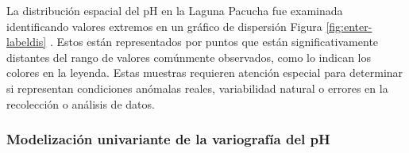  La distribución espacial del pH en la Laguna Pacucha fue examinada identificando valores extremos en un gráfico de dispersión Figura \ref{fig:enter-labeldis} . Estos están representados por puntos que están significativamente distantes del rango de valores comúnmente observados, como lo indican los colores en la leyenda. Estas muestras requieren atención especial para determinar si representan condiciones anómalas reales, variabilidad natural o errores en la recolección o análisis de datos.

\subsubsection{Modelización univariante de la variografía del pH}

